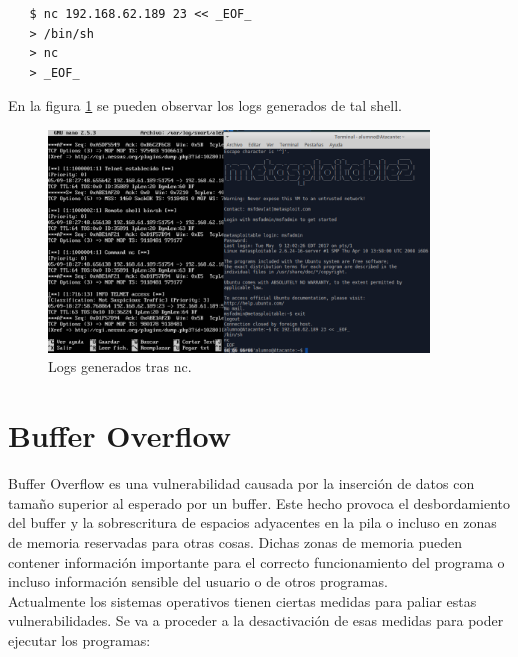 \documentclass[a4,12pt,onecolum]{article}
\begin{document}
\begin{enumerate}
  \begin{verbatim}
   $ nc 192.168.62.189 23 << _EOF_
   > /bin/sh
   > nc
   > _EOF_
  \end{verbatim}

  En la figura \ref{fig:snort9} se pueden observar los logs generados de tal shell.

  \begin{figure}[htbp]
  \centering
  \includegraphics[width=0.9\textwidth]{./images/Snortnc.png}
  \caption{Logs generados tras nc.}
  \label{fig:snort9}
  \end{figure}

\end{enumerate}

\clearpage
\section{Buffer Overflow}

Buffer Overflow es una vulnerabilidad causada por la inserción de datos con tamaño superior al esperado por un buffer. Este hecho provoca el desbordamiento del buffer y la sobrescritura de espacios adyacentes en la pila o incluso en zonas de memoria reservadas para otras cosas. Dichas zonas de memoria pueden contener información
importante para el correcto funcionamiento del programa o incluso información sensible del usuario o de otros programas. \\

Actualmente los sistemas operativos tienen ciertas medidas para paliar estas vulnerabilidades. Se va a proceder a la desactivación de esas medidas para poder ejecutar los programas:
\end{document}
